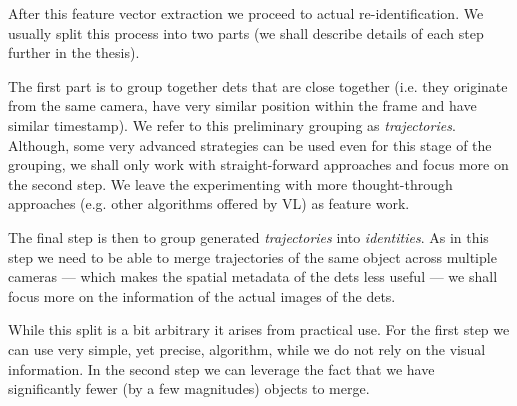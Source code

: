 After this feature vector extraction we proceed to actual re-identification.
We usually split this process into two parts (we shall describe details of
each step further in the thesis).

The first part is to group together \glspl{det} that are 
close together (i.e. they originate from the same camera, have very similar
position within the frame and have similar timestamp). We refer to this
preliminary grouping as \emph{trajectories}. Although, some very advanced
strategies can be used even for this stage of the grouping, we shall only work
with straight-forward approaches and focus more on the second step. We leave
the experimenting with more thought-through approaches (e.g. other algorithms
offered by \gls{VL}) as feature work.

The final step is then to group generated \emph{trajectories} into
\emph{identities}. As in this step we need to be able to merge trajectories
of the same object across multiple cameras --- which makes the spatial metadata
of the \glspl{det} less useful --- we shall focus more on the information
of the actual images of the \glspl{det}.

While this split is a bit arbitrary it arises from practical use. For the
first step we can use very simple, yet precise, algorithm, while we do not rely
on the visual information. In the second step we can leverage the fact
that we have significantly fewer (by a few magnitudes) objects to merge.



